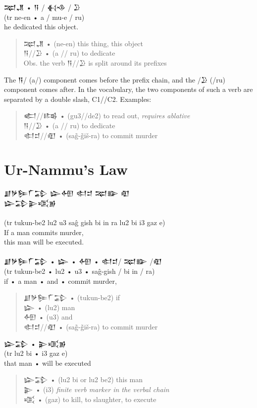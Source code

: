 \documentclass[a4paper,12pt]{book}
\newcommand{\fcn}{\setmainfont{Akkadian.otf}}
\newcommand{\fcm}{\large\setmainfont{Akkadian.otf}}
\newcommand{\fsm}{\Large\setmainfont{Akkadian.otf}}
\begin{document}
\newpage
\noindent
{\fcm 𒉈𒂗} • {\fcm 𒀀} / {\fcm 𒈬𒈾} / {\fcm 𒊒}\\
(tr ne-en • a / mu-e / ru)\\ 
he dedicated this object.\\
\begin{quote}
{\fcm 𒉈𒂗} • (ne-en) this thing, this object\\
{\fcm 𒀀}//{\fcm 𒊒} • (a // ru) to dedicate\\
Obs. the verb {\fcn 𒀀}//{\fcn 𒊒} is split around its prefixes
\end{quote}
The {\fcn 𒀀}/ (a/) component comes before the prefix chain,
and the /{\fcn 𒊒} (/ru) component comes after.
In the vocabulary, the two components
of such a verb are separated by a double
slash, C1//C2. Examples:
\begin{quote}
{\fcm 𒅗}//{\fcm 𒌤} • (gu3//de2) to read out,
  {\em requires ablative}\\
{\fcm 𒀀}//{\fcm 𒊒} • (a // ru) to dedicate\\
{\fcm 𒊕𒄑}//{\fcm 𒊏} • (sag̃-g̃iš-ra) to commit murder
\end{quote}

\section*{Ur-Nammu's Law}
\noindent
{\fsm 𒋗𒃻𒌉𒇲𒁉 𒇽𒅇 𒊕𒄑 𒉈𒅔 𒊏}\\
{\fsm 𒇽𒁉𒉌𒄤𒂊}\\
\verb||\\
(tr tukun-be2 lu2 u3 saĝ gish bi in ra lu2 bi i3 gaz e)\\
If a man commits murder,\\
this man will be executed.\\

\verb||\\
{\fcm 𒋗𒃻𒌉𒇲𒁉} • {\fcm 𒇽} • {\fcm 𒅇}
     • {\fcm 𒊕𒄑}/ {\fcm 𒉈𒅔} /{\fcm 𒊏}\\
(tr tukun-be2 • lu2 • u3 • saĝ-gish / bi in / ra)\\
if • a man • and • commit murder,\\
\begin{quote}  
{\fcm 𒋗𒃻𒌉𒇲𒁉} • (tukun-be2) if\\
{\fcm 𒇽} • (lu2) man\\
{\fcm 𒅇} • (u3) and\\
{\fcm 𒊕𒄑}//{\fcm 𒊏} • (sag̃-g̃iš-ra) to commit murder
\end{quote}

\newpage
\noindent
{\fcm 𒇽𒁉} • {\fcm 𒉌𒄤𒂊}\\
(tr lu2 bi • i3 gaz e)\\
that man • will be executed\\
\begin{quote}
{\fcm 𒇽𒁉} • (lu2 bi or lu2 be2) this man\\
{\fcm 𒉌} • (i3) {\em finite verb marker in the verbal chain}\\
{\fcm 𒄤} • (gaz) to kill, to slaughter, to execute
\end{quote}
\end{document}
